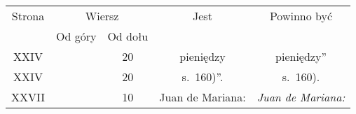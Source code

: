 \documentclass[a4paper,11pt]{article}
\begin{document}


\begin{center}

  \begin{tabular}{|c|c|c|c|c|}
    \hline
    Strona & \multicolumn{2}{c|}{Wiersz} & Jest
                              & Powinno być \\ \cline{2-3}
    & Od góry & Od dołu & & \\
    \hline
    XXIV  & & 20 & pieniędzy & pieniędzy” \\
    XXIV  & & 20 & s.~160)”. & s.~160). \\
    XXVII & & 10 & Juan de Mariana: & \textit{Juan de Mariana:} \\
    \hline
  \end{tabular}






\end{center}
\end{document}
